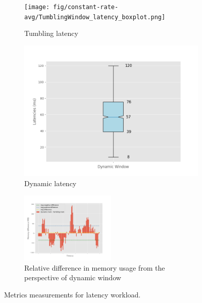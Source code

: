 \begin{figure}
\begin{subfigure}[b]{0.5\textwidth}
        \texttt{[image: fig/constant-rate-avg/TumblingWindow\_latency\_boxplot.png]}
        \caption{Tumbling latency}
        \label{fig:constant_tumb_boxplot}
    \end{subfigure}
    \hfill 
    \begin{subfigure}[b]{0.5\textwidth}
        \includegraphics[width=\textwidth]{fig/constant-rate/DynamicWindow_latency_boxplot.png}
        \caption{Dynamic latency}
        \label{fig:constant_dynamic_boxplot}
    \end{subfigure}
    \begin{subfigure}[b]{\textwidth}
        \centering
        \includegraphics[width=0.5\textwidth]{fig/constant-rate/mem_difference_bar.png}
        \caption{Relative difference in memory usage from the perspective of dynamic window}
        \label{fig:constant_mem_diff}
    \end{subfigure}

    \caption{Metrics measurements for latency workload.}%
    \label{fig:cpucomparison}
\end{figure}



